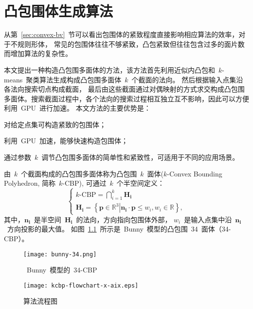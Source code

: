 

\chapter{凸包围体生成算法}
\label{cha:kcbp-construction}
从第~\ref{sec:convex-bv}~节可以看出包围体的紧致程度直接影响相应算法的效率，对于不规则形体， 常见的包围体往往不够紧致，凸包紧致但往往包含过多的面片数而增加算法的复杂性。

本文提出一种构造凸包围多面体的方法，该方法首先利用近似内凸包和~$k$-means~聚类算法生成构成凸包围多面体~$k$~个截面的法向。
然后根据输入点集沿各法向搜索切点构成截面， 最后由这些截面通过对偶映射的方式求交构成凸包围多面体。搜索截面过程中，各个法向的搜索过程相互独立互不影响，因此可以方便利用~GPU~进行加速。
本文方法的主要优势是：
\begin{inparaenum}[(1)]
\item 对给定点集可构造紧致的包围体；
\item 利用~GPU~加速，能够快速构造包围体；
\item 通过参数~$k$~调节凸包围多面体的简单性和紧致性，可适用于不同的应用场景。
\end{inparaenum}

由~$k$~个截面构成的凸包围多面体称为凸包围~$k$~面体($k$-Convex Bounding Polyhedron, 简称~$k$-CBP), 可通过~$k$~个半空间定义：
\begin{equation}
\label{equ:kcbp_definition}
\left\{
\begin{array}{l}
    k\mbox{-CBP} = \mathop  \bigcap \limits_{i = 1}^k \bm{H_i} \\
    \bm{H_i} = \left\{ {\left. {\bm{p} \in {\mathbb{R}^3}} \right| \bm{n_i} \cdot \bm{p} \le {w_i}} , w_i \in \mathbb{R} \right\},
\end{array}
\right.
\end{equation}
其中，$\bm{n_i}$~是半空间~$\bm{H_i}$~的法向，方向指向包围体外部，
$w_i$~是输入点集中沿~$\bm{n_i}$~方向投影的最大值。
如图~\ref{fig:bunny}~所示是~Bunny~模型的凸包围~34~面体（34-CBP）。

\begin{figure}[htbp] 
\centering
  \texttt{[image: bunny-34.png]}
  \caption{~Bunny~模型的~34-CBP }
  \label{fig:bunny}
\end{figure}

\begin{figure}[htbp]
    \centering
    \texttt{[image: kcbp-flowchart-x-aix.eps]}
    \caption{算法流程图}
    \label{lbl:kcbp-algorithm-flowchart}
\end{figure}

